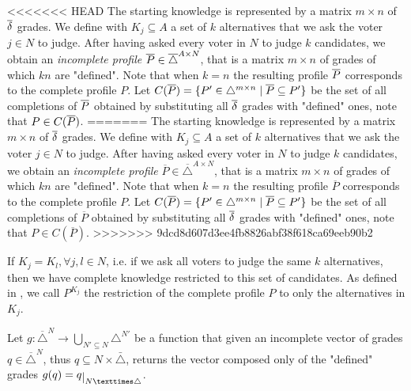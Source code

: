 \documentclass[version=3.21, pagesize, twoside=off, bibliography=totoc, DIV=calc, fontsize=12pt, a4paper]{scrartcl}
\begin{document}
<<<<<<< HEAD
The starting knowledge is represented by a matrix $m\times n$ of $\overline{\delta}$ grades. We define with $K_j \subseteq A$ a set of $k$ alternatives that we ask the voter $j\in N$ to judge. 
After having asked every voter in $N$ to judge $k$ candidates, we obtain an \emph{incomplete profile} $\overline{P}\in \overline{\triangle}^{A \times N}$, that is a matrix $m \times n$ of grades of which $kn$ are "defined".
Note that when $k=n$ the resulting profile $\overline{P}$ corresponds to the complete profile $P$. Let $C(\Pbar) = \{P' \in \triangle^{m \times n} \suchthat \Pbar \subseteq P'\}$ be the set of all completions of $\overline{P}$ obtained by substituting all $\overline{\delta}$ grades with "defined" ones, note that $P \in C(\overline{P})$.
=======
The starting knowledge is represented by a matrix $m\times n$ of $\overline{\delta}$ grades.  We define with $K_j \subseteq A$ a set of $k$ alternatives that we ask the voter $j\in N$ to judge. 
After having asked every voter in $N$ to judge $k$ candidates, we obtain an \emph{incomplete profile} $\overline{P}\in \overline{\triangle}^{A \times N}$, that is a matrix $m \times n$ of grades of which $kn$ are "defined".
Note that when $k=n$ the resulting profile $\overline{P}$ corresponds to the complete profile $P$. Let $C(\overline{P}) = \{P' \in \triangle^{m \times n} \suchthat \overline{P} \subseteq P'\}$ be the set of all completions of $\overline{P}$ obtained by substituting all $\overline{\delta}$ grades with "defined" ones, note that $P \in C(\overline{P})$.
>>>>>>> 9dcd8d607d3ee4fb8826abf38f618ca69eeb90b2
 
If $K_j=K_l, \forall j,l\in N$, i.e. if we ask all voters to judge the same $k$ alternatives, then we have complete knowledge restricted to this set of candidates. As defined in , we call $P^{K_j}$ the restriction of the complete profile $P$ to only the alternatives in $K_j$.

Let $g:\overline{\triangle}^N\rightarrow \bigcup_{N' \subseteq N}\triangle^{N'}$ be a function that given an incomplete vector of grades $q \in \overline{\triangle}^N$, thus $q \subseteq N × \bar{\triangle}$, returns the vector composed only of the "defined" grades $g(q) = \restr{q}{N × \triangle}$.
\end{document}
